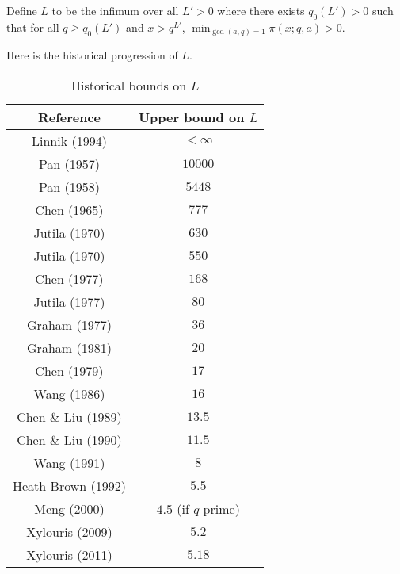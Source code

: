 \begin{definition}
Define $L$ to be the infimum over all $L'>0$ where there exists $q_0(L')>0$ such that for all $q\geq q_0(L')$ and $x>q^{L'}$, $\min_{\gcd(a,q)=1}\pi(x;q,a)>0$.
\end{definition}

Here is the historical progression of $L$.

\begin{table}[ht]
    \def\arraystretch{1.2}
    \centering
    \caption{Historical bounds on $L$}
    \begin{tabular}{|c|c|}
    \hline
    Reference & Upper bound on $L$\\
    \hline
    Linnik (1994) \cite{linnik-1} & $<\infty$\\
    \hline
    Pan (1957) \cite{pan_1957} & $10000$\\
    \hline
    Pan (1958) \cite{pan_1958} & $5448$\\
    \hline
    Chen (1965) \cite{chen_1965} & $777$\\
    \hline
    Jutila (1970) \cite{jutila_thesis} & $630$ \\
    \hline
    Jutila (1970) \cite{jutila_1970} & $550$ \\
    \hline
    Chen (1977) \cite{chen_1977} & $168$\\
    \hline
    Jutila (1977) \cite{jutila_linnik} & $80$\\
    \hline
    Graham (1977) \cite{graham_1977} & $36$\\
    \hline
    Graham (1981) \cite{graham_1981} & $20$\\
    \hline
    Chen (1979) \cite{chen_1979} & $17$\\
    \hline
    Wang (1986) \cite{wang_1986} & $16$\\
    \hline
    Chen \& Liu (1989) \cite{chen_liu_1989} & $13.5$\\
    \hline
    Chen \& Liu (1990) \cite{chen-liu-v} & $11.5$\\
    \hline
    Wang (1991) \cite{wang_1991} & $8$\\
    \hline
    Heath-Brown (1992) \cite{heath_brown_least_prime} & $5.5$\\
    \hline
    Meng (2000) \cite{meng} & $4.5$ (if $q$ prime)\\
    \hline
    Xylouris (2009) \cite{xylouris_thesis_2009} & $5.2$\\
    \hline
    Xylouris (2011) \cite{xylouris_2011} & $5.18$\\

\end{tabular}
\end{table}
